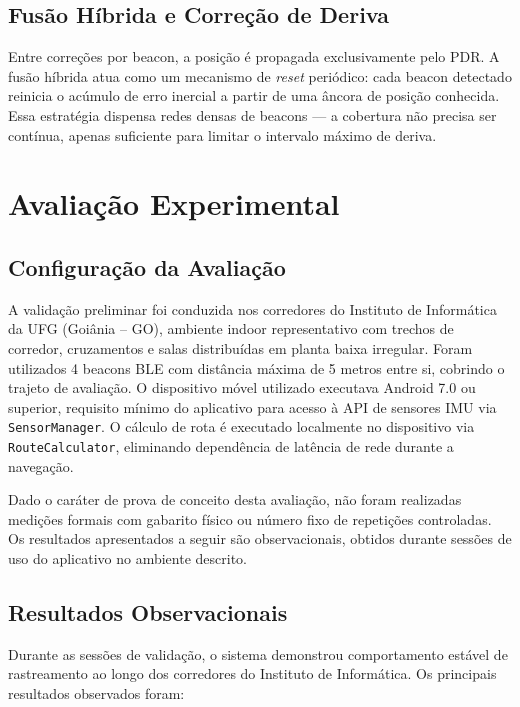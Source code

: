 \documentclass[12pt]{article}
\begin{document}
\subsection{Fusão Híbrida e Correção de Deriva}

Entre correções por beacon, a posição é propagada exclusivamente pelo PDR. A fusão
híbrida atua como um mecanismo de \textit{reset} periódico: cada beacon detectado
reinicia o acúmulo de erro inercial a partir de uma âncora de posição conhecida.
Essa estratégia dispensa redes densas de beacons — a cobertura não precisa ser
contínua, apenas suficiente para limitar o intervalo máximo de deriva.

\section{Avaliação Experimental}

\subsection{Configuração da Avaliação}

A validação preliminar foi conduzida nos corredores do Instituto de Informática da UFG
(Goiânia -- GO), ambiente indoor representativo com trechos de corredor, cruzamentos
e salas distribuídas em planta baixa irregular. Foram utilizados 4 beacons BLE
com distância máxima de 5 metros entre si, cobrindo o trajeto de avaliação.
O dispositivo móvel utilizado executava Android 7.0 ou superior, requisito mínimo
do aplicativo para acesso à API de sensores IMU via \texttt{SensorManager}.
O cálculo de rota é executado localmente no dispositivo via \texttt{RouteCalculator},
eliminando dependência de latência de rede durante a navegação.

Dado o caráter de prova de conceito desta avaliação, não foram realizadas medições
formais com gabarito físico ou número fixo de repetições controladas. Os resultados
apresentados a seguir são observacionais, obtidos durante sessões de uso do
aplicativo no ambiente descrito.

\subsection{Resultados Observacionais}

Durante as sessões de validação, o sistema demonstrou comportamento estável de
rastreamento ao longo dos corredores do Instituto de Informática. Os principais
resultados observados foram:
\end{document}
